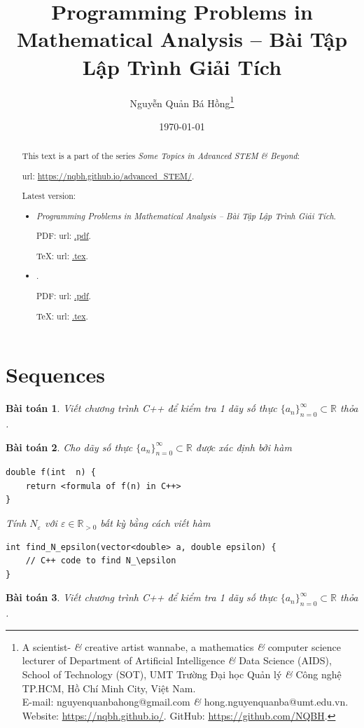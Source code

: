 \documentclass{article}
\title{Programming Problems in Mathematical Analysis -- Bài Tập Lập Trình Giải Tích}
\author{Nguyễn Quản Bá Hồng\footnote{A scientist- {\it\&} creative artist wannabe, a mathematics {\it\&} computer science lecturer of Department of Artificial Intelligence {\it\&} Data Science (AIDS), School of Technology (SOT), UMT Trường Đại học Quản lý {\it\&} Công nghệ TP.HCM, Hồ Chí Minh City, Việt Nam.\\E-mail: {\sf nguyenquanbahong@gmail.com} {\it\&} {\sf hong.nguyenquanba@umt.edu.vn}. Website: \url{https://nqbh.github.io/}. GitHub: \url{https://github.com/NQBH}.}}
\date{\today}
\newtheorem{baitoan}{Bài toán}
\begin{document}
\maketitle
\begin{abstract}
	This text is a part of the series {\it Some Topics in Advanced STEM \& Beyond}:
	
	{\sc url}: \url{https://nqbh.github.io/advanced_STEM/}.
	
	Latest version:
	\begin{itemize}
		\item {\it Programming Problems in Mathematical Analysis -- Bài Tập Lập Trình Giải Tích}.
		
		PDF: {\sc url}: \url{.pdf}.
		
		\TeX: {\sc url}: \url{.tex}.
		\item {\it }.
		
		PDF: {\sc url}: \url{.pdf}.
		
		\TeX: {\sc url}: \url{.tex}.
	\end{itemize}
\end{abstract}
\tableofcontents


\section{Sequences}

\begin{baitoan}
	Viết chương trình C++ để kiểm tra 1 dãy số thực $\{a_n\}_{n=0}^\infty\subset\mathbb{R}$ thỏa \cite[Def. 6.1.3]{Tao_analysis_1}.
\end{baitoan}

\begin{baitoan}
	Cho dãy số thực $\{a_n\}_{n=0}^\infty\subset\mathbb{R}$ được xác định bởi hàm
	\begin{verbatim}
double f(int  n) {
    return <formula of f(n) in C++>
}
	\end{verbatim}
	Tính $N_\varepsilon$ với $\varepsilon\in\mathbb{R}_{>0}$ bất kỳ bằng cách viết hàm
	\begin{verbatim}
int find_N_epsilon(vector<double> a, double epsilon) {
    // C++ code to find N_\epsilon
}
	\end{verbatim}
\end{baitoan}

\begin{baitoan}
	Viết chương trình C++ để kiểm tra 1 dãy số thực $\{a_n\}_{n=0}^\infty\subset\mathbb{R}$ thỏa \cite[Def. 6.1.5]{Tao_analysis_1}.
\end{baitoan}
\end{document}
